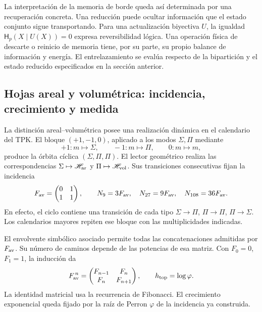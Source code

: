 La interpretación de la memoria de borde queda así determinada por
una recuperación concreta. Una reducción puede ocultar información
que el estado conjunto sigue transportando. Para una actualización
biyectiva \(U\), la igualdad \(\mathsf H_p(X\mid U(X))=0\) expresa
reversibilidad lógica. Una operación física de descarte o reinicio
de memoria tiene, por su parte, su propio balance de información y
energía. El entrelazamiento se evalúa respecto de la bipartición y
el estado reducido especificados en la sección anterior.

\subsection{Hojas areal y volumétrica: incidencia, crecimiento y medida}
\label{sec:ii-hojas-av}

La distinción areal--volumétrica posee una realización dinámica en el
calendario del TPK. El bloque \((+1,-1,0)\), aplicado a los modos
\(\Sigma,\Pi\) mediante
\[
 +1:m\mapsto\Sigma,\qquad -1:m\mapsto\Pi,\qquad 0:m\mapsto m,
\]
produce la órbita cíclica \((\Sigma,\Pi,\Pi)\). El lector geométrico
realiza las correspondencias \(\Sigma\mapsto\mathscr H_{\rm ar}\) y
\(\Pi\mapsto\mathscr H_{\rm vol}\). Sus transiciones consecutivas
fijan la incidencia
\begin{equation}
 F_{\rm av}=\begin{pmatrix}0&1\\1&1\end{pmatrix},\qquad
 N_9=3F_{\rm av},\quad N_{27}=9F_{\rm av},\quad
 N_{108}=36F_{\rm av}.
 \label{eq:ii-hojas-incidencia}
\end{equation}
En efecto, el ciclo contiene una transición de cada tipo
\(\Sigma\to\Pi\), \(\Pi\to\Pi\), \(\Pi\to\Sigma\).
Los calendarios mayores repiten ese bloque con las multiplicidades
indicadas.

El envolvente simbólico asociado permite todas las concatenaciones
admitidas por \(F_{\rm av}\). Su número de caminos depende de las
potencias de esa matriz. Con \(F_0=0\), \(F_1=1\), la inducción da
\begin{equation}
 F_{\rm av}^{\,n}=
 \begin{pmatrix}F_{n-1}&F_n\\F_n&F_{n+1}\end{pmatrix},
 \qquad h_{\rm top}=\log\varphi.
 \label{eq:ii-hojas-fibonacci}
\end{equation}
La identidad matricial usa la recurrencia de Fibonacci. El crecimiento
exponencial queda fijado por la raíz de Perron \(\varphi\) de la
incidencia ya construida.

